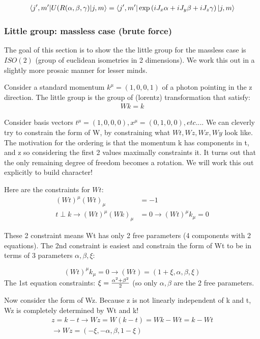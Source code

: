\documentclass[12pt]{scrartcl}
\begin{document}
\begin{align}
\braket{j', m' | U(R(\alpha, \beta, \gamma) |j, m} = \braket{j', m' | \exp \left(i J_x \alpha + i J_y \beta + i J_z \gamma \right) |j, m} 
\end{align}


\subsubsection{Little group: massless case (brute force)}

The goal of this section is to show the the little group for the massless case is $ISO(2)$ (group of euclidean isometries in 2 dimensions).  We work this out in a slightly more prosaic manner for lesser minds.

Consider a standard momentum $k^\mu = (1, 0, 0, 1)$ of a photon pointing in the z direction.  The little group is the group of (lorentz) transformation that satisfy:
\begin{align}
Wk = k
\end{align}

Consider basis vectors $t^\mu = (1, 0, 0, 0), x^\mu = (0, 1, 0, 0), etc...$.  We can cleverly try to constrain the form of W, by constraining what $Wt, Wz, Wx, Wy$ look like.  The motivation for the ordering is that the momentum k has components in t, and z so considering the first 2 values maximally constraints it.  It turns out that the only remaining degree of freedom becomes a rotation.  We will work this out explicitly to build character!

Here are the constraints for $Wt$:
\begin{align}
(Wt)^\mu (Wt)_\mu &= -1 \\
t \perp k \rightarrow (Wt)^\mu (Wk)_{\mu} & = 0 \rightarrow (Wt)^\mu k_\mu = 0
\end{align}

These 2 constraint means Wt has only 2 free parameters (4 components with 2 equations).  The 2nd constraint is easiest and constrain the form of Wt to be in terms of 3 parameters $\alpha, \beta, \xi$:

$$(Wt)^\mu k_\mu = 0 \rightarrow (Wt) = (1 + \xi, \alpha, \beta, \xi)$$
The 1st equation constraints:
$\xi = {\alpha^2 + \beta^2 \over 2}$ (so only $\alpha, \beta$ are the 2 free parameters.

Now consider the form of Wz. Because z is not linearly independent of k and t, Wz is completely determined by Wt and k!
\begin{align}
z = k - t \rightarrow Wz = W(k-t) = Wk - Wt = k - Wt \\
\rightarrow Wz = (-\xi, -\alpha, \beta, 1- \xi)
\end{align}
\end{document}
